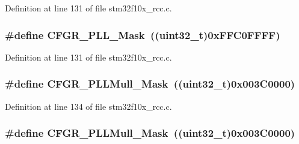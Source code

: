 Definition at line 131 of file stm32f10x\+\_\+rcc.\+c.

\subsubsection[{\texorpdfstring{C\+F\+G\+R\+\_\+\+P\+L\+L\+\_\+\+Mask}{CFGR_PLL_Mask}}]{\setlength{\rightskip}{0pt plus 5cm}\#define C\+F\+G\+R\+\_\+\+P\+L\+L\+\_\+\+Mask~(({\bf uint32\+\_\+t})0x\+F\+F\+C0\+F\+F\+F\+F)}\hypertarget{group___r_c_c___private___defines_gaea605b2eaea5332218130fc2d20d917c}{}\label{group___r_c_c___private___defines_gaea605b2eaea5332218130fc2d20d917c}


Definition at line 131 of file stm32f10x\+\_\+rcc.\+c.

\subsubsection[{\texorpdfstring{C\+F\+G\+R\+\_\+\+P\+L\+L\+Mull\+\_\+\+Mask}{CFGR_PLLMull_Mask}}]{\setlength{\rightskip}{0pt plus 5cm}\#define C\+F\+G\+R\+\_\+\+P\+L\+L\+Mull\+\_\+\+Mask~(({\bf uint32\+\_\+t})0x003\+C0000)}\hypertarget{group___r_c_c___private___defines_ga26ac4de307d4c081867dc0344f54c17a}{}\label{group___r_c_c___private___defines_ga26ac4de307d4c081867dc0344f54c17a}


Definition at line 134 of file stm32f10x\+\_\+rcc.\+c.

\subsubsection[{\texorpdfstring{C\+F\+G\+R\+\_\+\+P\+L\+L\+Mull\+\_\+\+Mask}{CFGR_PLLMull_Mask}}]{\setlength{\rightskip}{0pt plus 5cm}\#define C\+F\+G\+R\+\_\+\+P\+L\+L\+Mull\+\_\+\+Mask~(({\bf uint32\+\_\+t})0x003\+C0000)}\hypertarget{group___r_c_c___private___defines_ga26ac4de307d4c081867dc0344f54c17a}{}\label{group___r_c_c___private___defines_ga26ac4de307d4c081867dc0344f54c17a}



